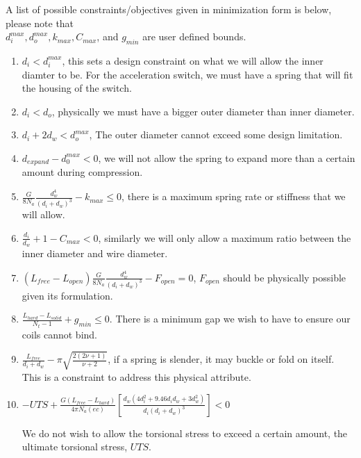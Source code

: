 \documentclass[10pt]{article}
\begin{document}
A list of possible constraints/objectives given in minimization form is below, please note that \\$d_{i}^{max}, d_{o}^{max}, k_{max}, C_{max}$, and $g_{min}$ are user defined bounds. 
\begin{enumerate}
	\item $d_{i} < d_{i}^{max}$, this sets a design constraint on what we will allow the inner diamter to be. For the acceleration switch, we must have a spring that will fit the housing of the switch.
	\item $d_{i} < d_{o}$, physically we must have a bigger outer diameter than inner diameter.
	\item $d_{i} + 2d_{w} < d_{o}^{max}$, The outer diameter cannot exceed some design limitation.
	\item$d_{expand} - d_{0}^{max} < 0 $, we will not allow the spring to expand more than a certain amount during compression.
	\item$ \frac{G}{8N_{a}}\frac{d_{w}^{4}}{(d_{i} + d_{w})^{3}} - k_{max} \le 0 $, there is a maximum spring rate or stiffness that we will allow. 

	\item $\frac{d_{i}}{d_{w}} + 1 - C_{max}< 0$, similarly we will only allow a maximum ratio between the inner diameter and wire diameter. 

	\item $(L_{free} - L_{open})\frac{G}{8N_{a}}\frac{d_{w}^{4}}{(d_{i} + d_{w})^{3}} - F_{open} = 0 $, $F_{open}$ should be physically possible given its formulation.

	\item $\frac{L_{hard} - L_{solid}}{N_{t} - 1} + g_{min} \le  0$. There is a minimum gap we wish to have to ensure our coils cannot bind. 

	\item$\frac{L_{free}}{d_{i} + d_{w}} - \pi \sqrt{\frac{2(2 \nu + 1)}{\nu + 2}}$, if a spring is slender, it may buckle or fold on itself. This is a constraint to address this physical attribute. 

	\item$-UTS + \frac{G(L_{free} - L_{hard})}{4 \pi N_{a} (ec)} \left[\frac{d_{w} (4d_{i}^{2} + 9.46d_{i} 
d_{w} + 3 d_{w}^{2})}{d_{i}(d_{i}+d_{w})^{3}}\right] < 0$

We do not wish to allow the torsional stress to exceed a certain amount, the ultimate torsional stress, $UTS$.

\end{enumerate}	
\end{document}

